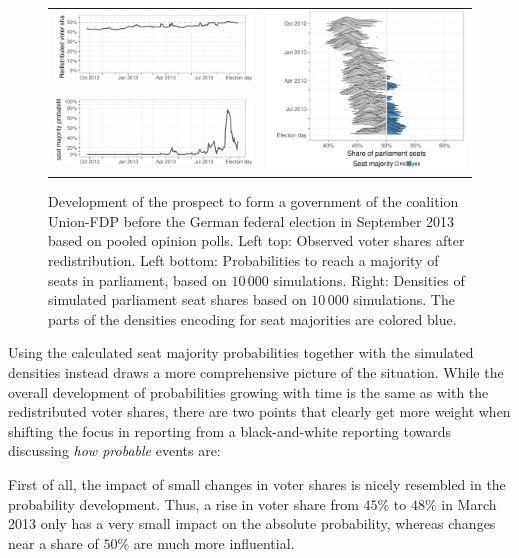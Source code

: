 \documentclass[smallcondensed]{svjour3}     %
\begin{document}
\begin{figure}[H]\centering
\begin{tabular}{ll}
\includegraphics[height=.15\textwidth]{figures/2013_pooled_cdufdp_rawSharesRedist.pdf}
&
\multirow{2}{*}[13ex]{\includegraphics[height=.3\textwidth]{figures/2013_pooled_cdufdp_ridgeline.pdf}}
\\
\includegraphics[height=.15\textwidth]{figures/2013_pooled_cdufdp_prob.pdf}
\end{tabular}
\caption{Development of the prospect to form a government of the coalition Union-FDP before the German federal election in September 2013 based on pooled opinion polls.
Left top: Observed voter shares after redistribution. Left bottom: Probabilities to reach a majority of seats in parliament, based on $10\,000$ simulations. Right: Densities of simulated parliament seat shares based on $10\,000$ simulations. The parts of the densities encoding for seat majorities are colored blue.
\label{fig:2013_cdufdp}
}
\end{figure}

Using the calculated seat majority probabilities together with
the simulated densities instead draws a more comprehensive picture
of the situation. While the overall development of probabilities
growing with time is the same as with the redistributed voter shares,
there are two points that clearly get more weight when shifting 
the focus in reporting from a black-and-white reporting towards
discussing {\it how probable} events are:

First of all, the impact of small changes in voter shares is nicely resembled
in the probability development. Thus, a rise in voter share from $45\%$ to 
$48\%$ in March 2013 only has a very small impact on the absolute
probability, whereas changes near a share of $50\%$ are much more influential.
\end{document}
